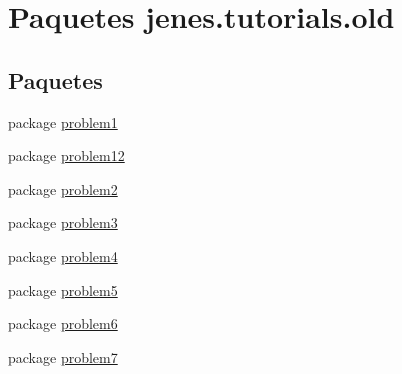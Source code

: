 \hypertarget{namespacejenes_1_1tutorials_1_1old}{\section{Paquetes jenes.\-tutorials.\-old}
\label{namespacejenes_1_1tutorials_1_1old}
}
\subsection*{Paquetes}
\begin{DoxyCompactItemize}
\item 
package \hyperlink{namespacejenes_1_1tutorials_1_1old_1_1problem1}{problem1}
\item 
package \hyperlink{namespacejenes_1_1tutorials_1_1old_1_1problem12}{problem12}
\item 
package \hyperlink{namespacejenes_1_1tutorials_1_1old_1_1problem2}{problem2}
\item 
package \hyperlink{namespacejenes_1_1tutorials_1_1old_1_1problem3}{problem3}
\item 
package \hyperlink{namespacejenes_1_1tutorials_1_1old_1_1problem4}{problem4}
\item 
package \hyperlink{namespacejenes_1_1tutorials_1_1old_1_1problem5}{problem5}
\item 
package \hyperlink{namespacejenes_1_1tutorials_1_1old_1_1problem6}{problem6}
\item 
package \hyperlink{namespacejenes_1_1tutorials_1_1old_1_1problem7}{problem7}
\end{DoxyCompactItemize}
